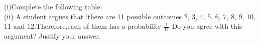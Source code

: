 (i)Complete the following table:
\\
(ii) A student argues that ‘there are 11 possible outcomes 2, 3, 4, 5, 6, 7, 8, 9, 10, 11 and 12.Therefore,each of them has a probability $\frac{1}{11}$ Do you agree with this argument? Justify your answer.